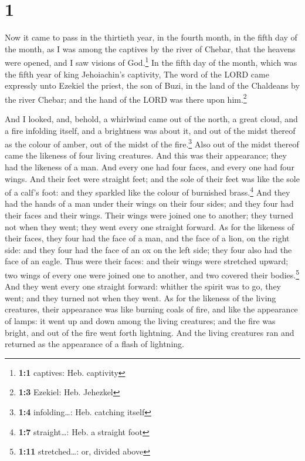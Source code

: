 \hypertarget{section}{%
\section{1}\label{section}}

 Now it came to pass in the thirtieth year, in the fourth
month, in the fifth day of the month, as I was among the captives by the
river of Chebar, that the heavens were opened, and I saw visions of
God.\footnote{\textbf{1:1} captives: Heb. captivity}  In
the fifth day of the month, which was the fifth year of king
Jehoiachin's captivity,  The word of the LORD came
expressly unto Ezekiel the priest, the son of Buzi, in the land of the
Chaldeans by the river Chebar; and the hand of the LORD was there upon
him.\footnote{\textbf{1:3} Ezekiel: Heb. Jehezkel}

 And I looked, and, behold, a whirlwind came out of the
north, a great cloud, and a fire infolding itself, and a brightness was
about it, and out of the midst thereof as the colour of amber, out of
the midst of the fire.\footnote{\textbf{1:4} infolding\ldots: Heb.
  catching itself}  Also out of the midst thereof came the
likeness of four living creatures. And this was their appearance; they
had the likeness of a man.  And every one had four faces,
and every one had four wings.  And their feet were
straight feet; and the sole of their feet was like the sole of a calf's
foot: and they sparkled like the colour of burnished brass.\footnote{\textbf{1:7}
  straight\ldots: Heb. a straight foot}  And they had the
hands of a man under their wings on their four sides; and they four had
their faces and their wings.  Their wings were joined one
to another; they turned not when they went; they went every one straight
forward.  As for the likeness of their faces, they four
had the face of a man, and the face of a lion, on the right side: and
they four had the face of an ox on the left side; they four also had the
face of an eagle.  Thus were their faces: and their wings
were stretched upward; two wings of every one were joined one to
another, and two covered their bodies.\footnote{\textbf{1:11}
  stretched\ldots: or, divided above}  And they went
every one straight forward: whither the spirit was to go, they went; and
they turned not when they went.  As for the likeness of
the living creatures, their appearance was like burning coals of fire,
and like the appearance of lamps: it went up and down among the living
creatures; and the fire was bright, and out of the fire went forth
lightning.  And the living creatures ran and returned as
the appearance of a flash of lightning.

